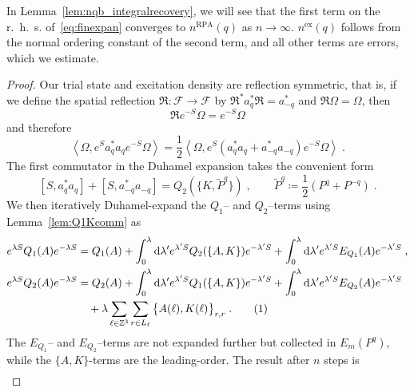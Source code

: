 \documentclass[12pt,a4paper]{article}
\numberwithin{equation}{section}
\newcommand{\cF}{\mathcal{F}}
\newcommand{\fR}{\mathfrak{R}}
\newcommand{\1}{\mathbb{I}}
\newcommand{\di}{\textnormal{d}}
\newcommand{\ex}{\mathrm{ex}}
\newcommand{\RPA}{\mathrm{RPA}}
\newcommand{\tagg}[1]{ \stepcounter{equation} \tag{\theequation}
\label{#1} } %
\newcommand{\Zstar}{\mathbb{Z}^3} %
\newcommand{\Z}{\mathbb{Z}}
\newcommand{\half}{\frac{1}{2}}
\newcommand{\eva}[1]{\left\langle #1 \right\rangle}
\theoremstyle{plain}
\theoremstyle{definition}
\theoremstyle{remark}
\theoremstyle{plain}
\theoremstyle{definition}
\theoremstyle{remark}
\begin{document}
In Lemma~\ref{lem:nqb_integralrecovery}, we will see that the first term on the r.~h.~s. of~\eqref{eq:finexpan} converges to $ n^{\RPA}(q) $ as $ n \to \infty $. $ n^{\ex}(q) $ follows from the normal ordering constant of the second term, and all other terms are errors, which we estimate.


\begin{proof}
Our trial state and excitation density are reflection symmetric, that is, if we define the spatial reflection $ \fR: \cF \to \cF $ by $ \fR^* a_q^* \fR = a^*_{-q} $ and $ \fR \Omega = \Omega $, then
\begin{equation} \label{eq:reflectionsymmetry}
	\fR e^{-S} \Omega = e^{-S} \Omega
\end{equation}
and therefore
\begin{equation}
	\eva{\Omega, e^{S} a_q^* a_q e^{-S} \Omega} = \half \eva{\Omega, e^{S} (a_q^* a_q + a_{-q}^* a_{-q}) e^{-S} \Omega} \;.
\end{equation}
The first commutator in the Duhamel expansion takes the convenient form
\begin{equation} \label{eq:firstcommutator}
	[S, a_q^* a_q] + [S, a_{-q}^* a_{-q}]
	= Q_2(\{K,\tilde{P}^q\}) \;, \qquad
	\tilde{P}^q \coloneq \half(P^q + P^{-q}) \;.
\end{equation}
We then iteratively Duhamel-expand the $ Q_1$-- and $ Q_2 $--terms using Lemma~\ref{lem:Q1Kcomm} as
\begin{align*}
	e^{\lambda S} Q_1(A) e^{-\lambda S}
	&= Q_1(A) + \int_0^{\lambda} \di \lambda' e^{\lambda' S} Q_2(\{A,K\}) e^{-\lambda' S}
		+ \int_0^{\lambda} \di \lambda' e^{\lambda' S} E_{Q_1}(A) e^{-\lambda' S} \;, \\
	e^{\lambda S} Q_2(A) e^{-\lambda S}
	&= Q_2(A) + \int_0^{\lambda} \di \lambda' e^{\lambda' S} Q_1(\{A,K\}) e^{-\lambda' S}
		+ \int_0^{\lambda} \di \lambda' e^{\lambda' S} E_{Q_2}(A) e^{-\lambda' S} \\
	&\quad + \lambda \sum_{\ell \in \Zstar} \sum_{r \in L_{\ell}} \big\{ A(\ell), K(\ell) \big\}_{r,r} \;. \tagg{eq:expand}
\end{align*}
The $ E_{Q_1}$-- and $ E_{Q_2} $--terms are not expanded further but collected in $ E_m(P^q) $, while the $ \{A,K\} $-terms are the leading-order. The result after $ n $ steps is
\begin{align}

\end{align}
\end{proof}
\end{document}
